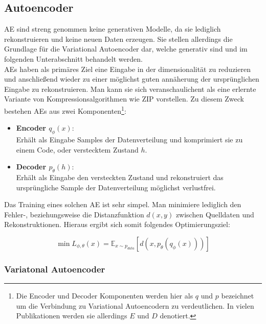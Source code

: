 \subsection{Autoencoder}

\ac{AE} sind streng genommen keine generativen Modelle, da sie lediglich rekonstruieren und keine neuen Daten erzeugen. Sie stellen allerdings die Grundlage für die Variational Autoencoder dar, welche generativ sind und im folgenden Unterabschnitt behandelt werden. \\ 
AEs haben als primäres Ziel eine Eingabe in der dimensionalität zu reduzieren und anschließend wieder zu einer möglichst guten annäherung der ursprünglichen Eingabe zu rekonstruieren. Man kann sie sich veranschaulichent als eine erlernte Variante von Kompressionsalgorithmen wie ZIP vorstellen. 
Zu diesem Zweck bestehen \ac{AE}s aus zwei Komponenten\footnote{
    Die Encoder und Decoder Komponenten werden hier als $q$ und $p$ bezeichnet um die Verbindung zu Variational Autoencodern zu verdeutlichen. In vielen Publikationen werden sie allerdings $E$ und $D$ denotiert.    
}:
\begin{itemize}
    \item \textbf{Encoder $q_\phi(x)$}: \\
    Erhält als Eingabe Samples der Datenverteilung und komprimiert sie zu einem Code, oder verstecktem Zustand $h$.
    \item \textbf{Decoder $p_\theta(h)$}: \\
    Erhält als Eingabe den versteckten Zustand und rekonstruiert das ursprüngliche Sample der Datenverteilung möglichst verlustfrei.
\end{itemize}

Das Training eines solchen \ac{AE} ist sehr simpel. Man minimiere lediglich den Fehler-, beziehungsweise die Distanzfunktion $d(x, y)$ zwischen Quelldaten und Rekonstruktionen. Hieraus ergibt sich somit folgendes Optimierungsziel:

\begin{equation}
    \min L_{\phi, \theta}(x) = \mathbb E _{x \sim p_{data}} 
    \left [ 
        d(x, p_\theta(q_\phi(x)))
    \right ]
\end{equation}

\subsubsection{Variatonal Autoencoder}

